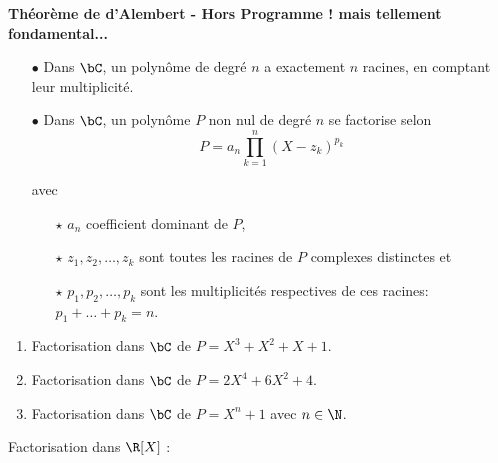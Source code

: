 \documentclass[a4paper, 11pt,reqno]{article}
\begin{document}
{\noindent

	\begin{theorem} \textbf{Th\'eor\`eme de d'Alembert - Hors Programme ! mais tellement fondamental...}
		\begin{itemize}
			\item[$\bullet$] Dans $\bC$, un polyn\^ome de degr\'e $n$ a exactement $n$ racines, en comptant leur multiplicit\'e.
			\item[$\bullet$] Dans $\bC$, un polyn\^ome $P$ non nul de degr\'e $n$ se factorise selon
			      $$P = a_n \prod_{k=1}^n (X-z_k)^{p_k}$$


			      avec
			      \begin{itemize}
				      \item[$\star$] $a_n$ coefficient dominant de $P$,
				      \item[$\star$] $z_1,z_2,\dots,z_k$ sont toutes les racines de $P$ complexes distinctes et
				      \item[$\star$] $p_1,p_2,\dots,p_k$ sont les multiplicit\'es respectives de ces racines: $p_1+\dots+p_k=n$.
			      \end{itemize}
		\end{itemize}
	\end{theorem}

}\vsec\vsec

\setlength\fboxrule{1pt}
\setlength\fboxrule{0.5pt}

{\footnotesize
	\begin{exercice}
		\begin{enumerate}
			\item Factorisation dans $\bC$ de $P=X^3+X^2+X+1$.
			\item Factorisation dans $\bC$ de $P=2X^4+6X^2+4$.
			\item Factorisation dans $\bC$ de $P=X^n+1$ avec $n\in\N$.
		\end{enumerate}
	\end{exercice}
}



\begin{rem}
	Factorisation dans $\R[X]$ :

\end{rem}
\end{document}
